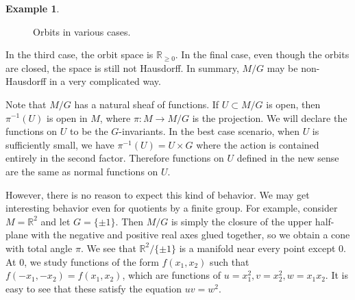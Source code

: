 \documentclass[leqno, openany]{memoir}
\theoremstyle{definition}
\newtheorem{exm}[thm]{Example}
\theoremstyle{remark}
\theoremstyle{plain}
\theoremstyle{definition}
\theoremstyle{remark}
\newcommand{\R}{\mathbb{R}}
\begin{document}
\begin{exm}
\begin{figure}[H]
\begin{subfigure}[b]{0.2\textwidth}
\begin{center}
        \end{center}
        \caption{}
        \label{fig:orbits-c}
        \end{subfigure}
        \begin{subfigure}[b]{0.2\textwidth}
        \begin{center}
        \end{center}
        \caption{}
        \label{fig:orbits-d}
        \end{subfigure}
        \caption{Orbits in various cases.}%
        \label{fig:orbits}
    \end{figure}
    In the third case, the orbit space is $\R_{\geq 0}$. In the final case, even though the orbits are closed, the space is still not Hausdorff. In summary, $M/G$ may be non-Hausdorff in a very complicated way.
\end{exm}

Note that $M/G$ has a natural sheaf of functions. If $U \subset M/G$ is open, then $\pi^{-1}(U)$ is open in $M$, where $\pi: M \to M/G$ is the projection. We will declare the functions on $U$ to be the $G$-invariants. In the best case scenario, when $U$ is sufficiently small, we have $\pi^{-1}(U) = U \times G$ where the action is contained entirely in the second factor. Therefore functions on $U$ defined in the new sense are the same as normal functions on $U$.

However, there is no reason to expect this kind of behavior. We may get interesting behavior even for quotients by a finite group. For example, consider $M = \R^2$ and let $G = \{ \pm 1 \}$. Then $M / G$ is simply the closure of the upper half-plane with the negative and positive real axes glued together, so we obtain a cone with total angle $\pi$. We see that $\R^2 / \{ \pm 1 \}$ is a manifold near every point except $0$. At $0$, we study functions of the form $f(x_1,x_2)$ such that $f(-x_1,-x_2) = f(x_1,x_2)$, which are functions of $u = x_1^2, v = x_2^2, w = x_1x_2$. It is easy to see that these satisfy the equation $uv = w^2$.
\end{document}

